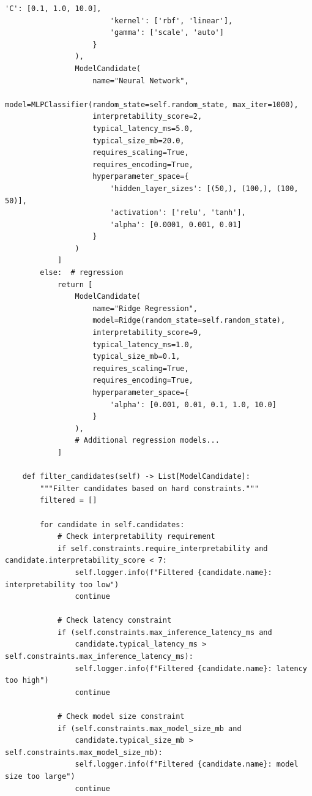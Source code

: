 \begin{lstlisting}[style=python, caption={Automated Model Selection Framework}]
                        'C': [0.1, 1.0, 10.0],
                        'kernel': ['rbf', 'linear'],
                        'gamma': ['scale', 'auto']
                    }
                ),
                ModelCandidate(
                    name="Neural Network",
                    model=MLPClassifier(random_state=self.random_state, max_iter=1000),
                    interpretability_score=2,
                    typical_latency_ms=5.0,
                    typical_size_mb=20.0,
                    requires_scaling=True,
                    requires_encoding=True,
                    hyperparameter_space={
                        'hidden_layer_sizes': [(50,), (100,), (100, 50)],
                        'activation': ['relu', 'tanh'],
                        'alpha': [0.0001, 0.001, 0.01]
                    }
                )
            ]
        else:  # regression
            return [
                ModelCandidate(
                    name="Ridge Regression",
                    model=Ridge(random_state=self.random_state),
                    interpretability_score=9,
                    typical_latency_ms=1.0,
                    typical_size_mb=0.1,
                    requires_scaling=True,
                    requires_encoding=True,
                    hyperparameter_space={
                        'alpha': [0.001, 0.01, 0.1, 1.0, 10.0]
                    }
                ),
                # Additional regression models...
            ]

    def filter_candidates(self) -> List[ModelCandidate]:
        """Filter candidates based on hard constraints."""
        filtered = []

        for candidate in self.candidates:
            # Check interpretability requirement
            if self.constraints.require_interpretability and candidate.interpretability_score < 7:
                self.logger.info(f"Filtered {candidate.name}: interpretability too low")
                continue

            # Check latency constraint
            if (self.constraints.max_inference_latency_ms and
                candidate.typical_latency_ms > self.constraints.max_inference_latency_ms):
                self.logger.info(f"Filtered {candidate.name}: latency too high")
                continue

            # Check model size constraint
            if (self.constraints.max_model_size_mb and
                candidate.typical_size_mb > self.constraints.max_model_size_mb):
                self.logger.info(f"Filtered {candidate.name}: model size too large")
                continue


\end{lstlisting}
